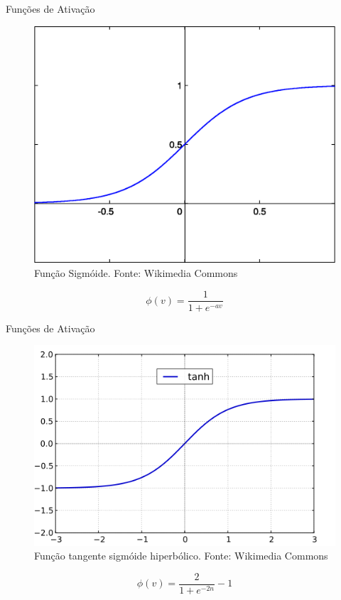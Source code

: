 \documentclass{beamer}
\begin{document}
      \begin{frame}{Funções de Ativação}
	\begin{figure}[htpb]
	\includegraphics[scale=0.4]{sigmoide.png}
	\caption{Função Sigmóide. Fonte: Wikimedia Commons }
	\end{figure}

	$$\phi (v) = \frac{1}{1 + e^{-av}}$$

      \end{frame}
      
      \begin{frame}{Funções de Ativação}
	\begin{figure}[htpb]
	\includegraphics[scale=0.4]{tanh.png}
	\caption{Função tangente sigmóide hiperbólico. Fonte: Wikimedia Commons }
	\end{figure}

	$$\phi (v) = \frac{2}{1 + e^{-2n}} - 1 $$

      \end{frame}
\end{document}
